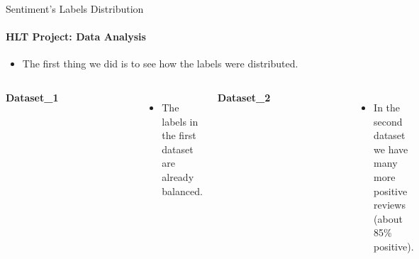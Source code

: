 \documentclass{beamer}
\theoremstyle{definition}
\theoremstyle{plain}
\begin{document}
\begin{frame}{Sentiment's Labels Distribution}
\framesubtitle{HLT Project: Data Analysis}
{\small 

\begin{itemize}
    \item The first thing we did is to see how the labels were distributed.
\end{itemize}
\vspace{-0.2cm}
\begin{columns}
    \center
    \textbf{Dataset\_1}
    \begin{figure}
        \centering
        \includegraphics[scale=0.23]{Figures/fig1.png}
    \end{figure}
    \vspace{-0.2cm}
    \begin{itemize}
        \item The labels in the first dataset are already balanced.
    \end{itemize}
    
    \center
    \textbf{Dataset\_2}
    \begin{figure}
        \centering
        \includegraphics[scale=0.23]{Figures/fig3.png}
    \end{figure}
    \vspace{-0.2cm}
    \begin{itemize}
        \item In the second dataset we have many more positive reviews (about 85\% positive).
    \end{itemize}
    
\end{columns}

}
\end{frame}
\end{document}
